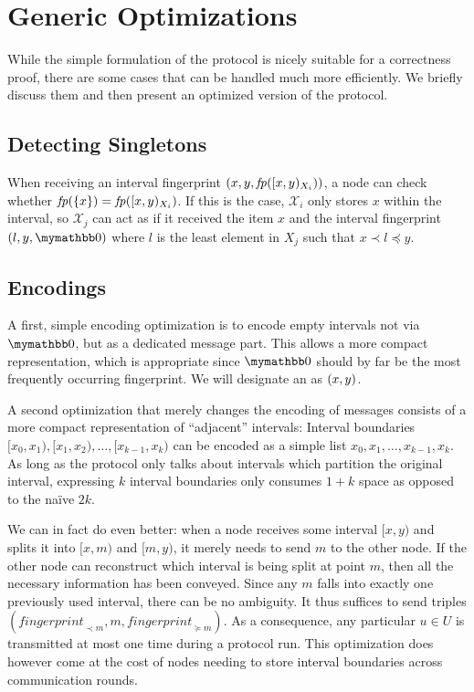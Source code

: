 \section{Generic Optimizations}
\label{set-reconciliation-simple-optimizations}

While the simple formulation of the protocol is nicely suitable for a correctness proof, there are some cases that can be handled much more efficiently. We briefly discuss them and then present an optimized version of the protocol.

\subsection{Detecting Singletons}

When receiving an interval fingerprint $({x}, {y}, {\mathit{fp}([{x},{y})_{X_i})})$, a node can check whether $\mathit{fp}(\{x\}) =  \mathit{fp}([{x},{y})_{X_i})$. If this is the case, $\mathcal{X}_i$ only stores $x$ within the interval, so $\mathcal{X}_j$ can act as if it received the item $x$ and the interval fingerprint $\ifpmanual{l}{y}{\neutraladd}$ where $l$ is the least element in $X_j$ such that $x \prec l \preceq y$.

\subsection{Encodings}

A first, simple encoding optimization is to encode empty intervals not via $\neutraladd$, but as a dedicated message part. This allows a more compact representation, which is appropriate since $\neutraladd$ should by far be the most frequently occurring fingerprint. We will designate an  as $({x}, {y})$.

A second optimization that merely changes the encoding of messages consists of a more compact representation of ``adjacent'' intervals: Interval boundaries $[x_0, x_1), [x_1, x_2), \ldots, [x_{k - 1}, x_k)$ can be encoded as a simple list $x_0, x_1, \ldots, x_{k - 1}, x_k$. As long as the protocol only talks about intervals which partition the original interval, expressing $k$ interval boundaries only consumes $1 + k$ space as opposed to the naïve $2k$.

We can in fact do even better: when a node receives some interval $[x, y)$ and splits it into $[x, m)$ and $[m, y)$, it merely needs to send $m$ to the other node. If the other node can reconstruct which interval is being split at point $m$, then all the necessary information has been conveyed. Since any $m$ falls into exactly one previously used interval, there can be no ambiguity. It thus suffices to send triples $( \mathit{fingerprint}_{\prec m}, m, \mathit{fingerprint}_{\succeq m})$. As a consequence, any particular $u \in U$ is transmitted at most one time during a protocol run. This optimization does however come at the cost of nodes needing to store interval boundaries across communication rounds.

